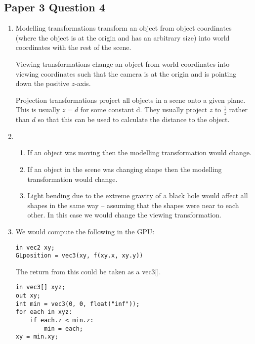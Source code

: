 \documentclass[10pt,\jkfside,a4paper]{article}
\begin{document}
\subsection*{Paper 3 Question 4}

\begin{enumerate}[label = (\alph*)]

\item Modelling transformations transform an object from object coordinates (where the object is 
at the origin and has an arbitrary size) into world coordinates with the rest of the scene.

Viewing transformations change an object from world coordinates into viewing coordinates such that the camera 
is at the origin and is pointing down the positive $z$-axis.

Projection transformations project all objects in a scene onto a given plane. This is usually $z=d$ for some 
constant d. They usually project $z$ to $\frac{1}{z}$ rather than $d$ so that this can be used to calculate 
the distance to the object.

\item
\begin{enumerate}[label=(\roman*)]

\item If an object was moving then the modelling transformation would change.

\item If an object in the scene was changing shape then the modelling transformation would change.

\item Light bending due to the extreme gravity of a black hole would affect all shapes in the same way -- 
assuming that the shapes were near to each other. In this case we would change the viewing transformation.

\end{enumerate}

\item 
We would compute the following in the GPU:

\begin{lstlisting}
in vec2 xy;
GLposition = vec3(xy, f(xy.x, xy.y))
\end{lstlisting}

The return from this could be taken as a vec3[].

\begin{lstlisting}
in vec3[] xyz;
out xy;
int min = vec3(0, 0, float("inf"));
for each in xyz:
	if each.z < min.z:
		min = each;
xy = min.xy;
\end{lstlisting}


\end{enumerate}
\end{document}

